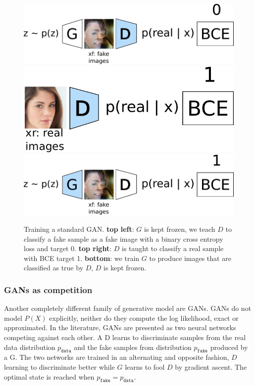 \begin{figure}[ht]
    \centering
    \includegraphics[scale=0.5]{60-files/gan-learn-D-fake.pdf} \hspace{1cm}
    \includegraphics[scale=0.5]{60-files/gan-learn-D-real.pdf}
    \includegraphics[scale=0.5]{60-files/gan-learn-G.pdf}
    \caption{Training a standard \ac{GAN}. \textbf{top left}: $G$ is kept frozen, we teach $D$ to classify a fake sample as a fake image with a binary cross entropy loss and target 0. \textbf{top right}: $D$ is taught to classify a real sample with BCE target 1. \textbf{bottom}: we train $G$ to produce images that are classified as true by $D$, $D$ is kept frozen.}
    \label{fig:gan-training}
\end{figure}

\subsubsection{\acp{GAN} as competition}


\newcommand{\pdata}[0]{p_\texttt{data}}
\newcommand{\pfake}[0]{p_\texttt{fake}}
\newcommand{\ppath}[0]{p_\texttt{path}}

Another completely different family of generative model are \acp{GAN}. \acp{GAN} do not model $P(X)$ explicitly, neither do they compute the log likelihood, exact or approximated. In the literature, \acp{GAN} are presented as two neural networks competing against each other. A \ac{D} learns to discriminate samples from the real data distribution $\pdata$ and the fake samples from distribution $\pfake$ produced by a \ac{G}. The two networks are trained in an alternating and opposite fashion, $D$ learning to discriminate better while $G$ learns to fool $D$ by gradient ascent. The optimal state is reached when $\pfake = \pdata$.

